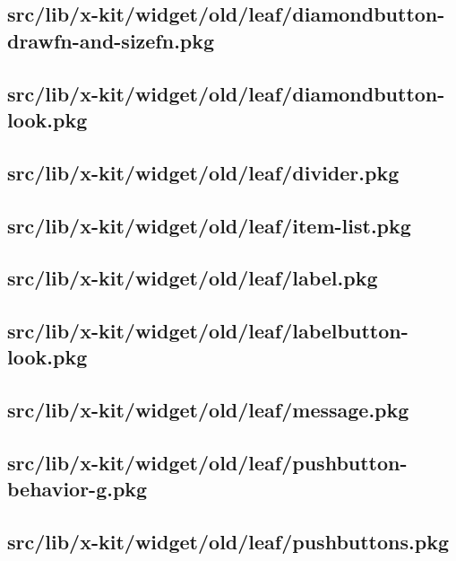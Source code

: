 \subsection{src/lib/x-kit/widget/old/leaf/diamondbutton-drawfn-and-sizefn.pkg}


\subsection{src/lib/x-kit/widget/old/leaf/diamondbutton-look.pkg}


\subsection{src/lib/x-kit/widget/old/leaf/divider.pkg}


\subsection{src/lib/x-kit/widget/old/leaf/item-list.pkg}


\subsection{src/lib/x-kit/widget/old/leaf/label.pkg}


\subsection{src/lib/x-kit/widget/old/leaf/labelbutton-look.pkg}


\subsection{src/lib/x-kit/widget/old/leaf/message.pkg}


\subsection{src/lib/x-kit/widget/old/leaf/pushbutton-behavior-g.pkg}


\subsection{src/lib/x-kit/widget/old/leaf/pushbuttons.pkg}


